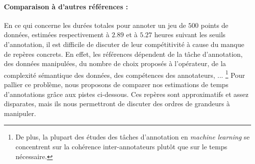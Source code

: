 			\paragraph{Comparaison à d'autres références :}
			En ce qui concerne les durées totales pour annoter un jeu de $500$ points de données, estimées respectivement à $2.89$ et à $5.27$ heures suivant les seuils d'annotation, il est difficile de discuter de leur compétitivité à cause du manque de repères concrets.
			En effet, les références dépendent de la tâche d'annotation, des données manipulées, du nombre de choix proposés à l'opérateur, de la complexité sémantique des données, des compétences des annotateurs, ...
			\footnote{De plus, la plupart des études des tâches d'annotation en \textit{machine learning} se concentrent sur la cohérence inter-annotateurs plutôt que sur le temps nécessaire.}
			Pour pallier ce problème, nous proposons de comparer nos estimations de temps d'annotations grâce aux pistes ci-dessous.
			Ces repères sont approximatifs et assez disparates, mais ils nous permettront de discuter des ordres de grandeurs à manipuler.
			
